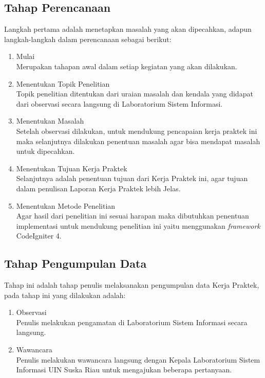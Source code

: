 \subsection{Tahap Perencanaan }
Langkah pertama adalah menetapkan masalah yang akan dipecahkan, adapun langkah-langkah dalam perencanaan sebagai berikut:
\begin{enumerate}
  \item Mulai \\
        Merupakan tahapan awal dalam setiap kegiatan yang akan dilakukan.
  \item Menentukan Topik Penelitian \\
        Topik penelitian ditentukan dari uraian masalah dan kendala yang didapat dari observasi secara langsung di Laboratorium Sistem Informasi.
  \item Menentukan Masalah \\
        Setelah observasi dilakukan, untuk mendukung pencapaian kerja praktek ini maka selanjutnya dilakukan penentuan masalah agar bisa mendapat masalah untuk dipecahkan.
  \item Menentukan Tujuan Kerja Praktek \\
        Selanjutnya adalah penentuan tujuan dari Kerja Praktek ini, agar tujuan dalam penulisan Laporan Kerja Praktek lebih Jelas.
  \item Menentukan Metode Penelitian \\
        Agar hasil dari penelitian ini sesuai harapan maka dibutuhkan penentuan implementasi untuk mendukung penelitian ini yaitu menggunakan \textit{framework} CodeIgniter 4.
\end{enumerate}
\subsection{Tahap Pengumpulan Data}
Tahap ini adalah tahap penulis melaksanakan pengumpulan data Kerja Praktek, pada tahap ini yang dilakukan adalah:
\begin{enumerate}
  \item  Observasi \\
        Penulis melakukan pengamatan di Laboratorium Sistem Informasi secara langsung.
  \item  Wawancara \\
        Penulis melakukan wawancara langsung dengan Kepala Laboratorium Sistem Informasi UIN Suska Riau untuk mengajukan beberapa pertanyaan.
\end{enumerate}

